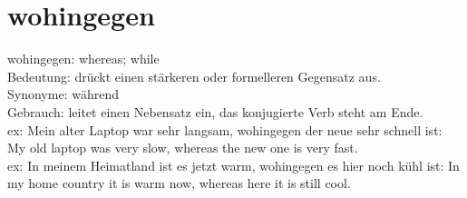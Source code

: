 \documentclass[a4paper]{article}
\begin{document}
    
    \section{wohingegen}
        wohingegen: whereas; while \\
        Bedeutung: drückt einen stärkeren oder formelleren Gegensatz aus. \\
        Synonyme: während \\
        Gebrauch: leitet einen Nebensatz ein, das konjugierte Verb steht am Ende. \\
        ex: Mein alter Laptop war sehr langsam, wohingegen der neue sehr schnell ist: My old laptop was very slow, whereas the new one is very fast. \\
        ex: In meinem Heimatland ist es jetzt warm, wohingegen es hier noch kühl ist: In my home country it is warm now, whereas here it is still cool. \\
    
\end{document}
